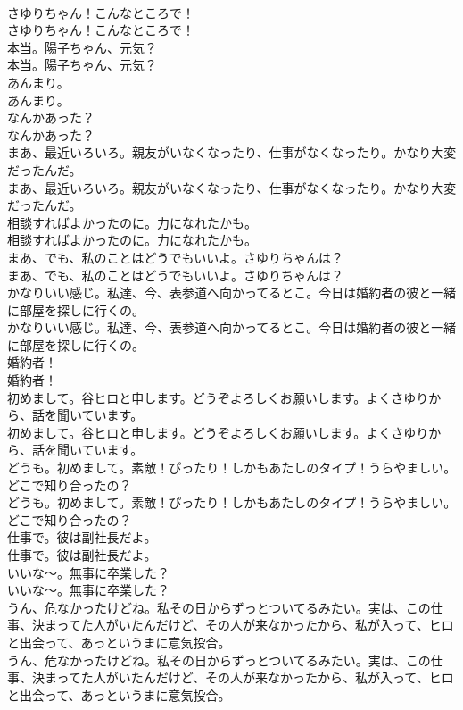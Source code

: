 \documentclass[8pt]{extreport}
\begin{document}
\begin{CJK}{UTF8}{min}
\\	さゆりちゃん！こんなところで！	
\\	さゆりちゃん！こんなところで！ 
\\	本当。陽子ちゃん、元気？	
\\	本当。陽子ちゃん、元気？ 
\\	あんまり。	
\\	あんまり。 
\\	なんかあった？	
\\	なんかあった？ 
\\	まあ、最近いろいろ。親友がいなくなったり、仕事がなくなったり。かなり大変だったんだ。	
\\	まあ、最近いろいろ。親友がいなくなったり、仕事がなくなったり。かなり大変だったんだ。 
\\	相談すればよかったのに。力になれたかも。	
\\	相談すればよかったのに。力になれたかも。 
\\	まあ、でも、私のことはどうでもいいよ。さゆりちゃんは？	
\\	まあ、でも、私のことはどうでもいいよ。さゆりちゃんは？ 
\\	かなりいい感じ。私達、今、表参道へ向かってるとこ。今日は婚約者の彼と一緒に部屋を探しに行くの。	
\\	かなりいい感じ。私達、今、表参道へ向かってるとこ。今日は婚約者の彼と一緒に部屋を探しに行くの。 
\\	婚約者！	
\\	婚約者！ 
\\	初めまして。谷ヒロと申します。どうぞよろしくお願いします。よくさゆりから、話を聞いています。	
\\	初めまして。谷ヒロと申します。どうぞよろしくお願いします。よくさゆりから、話を聞いています。 
\\	どうも。初めまして。素敵！ぴったり！しかもあたしのタイプ！うらやましい。どこで知り合ったの？	
\\	どうも。初めまして。素敵！ぴったり！しかもあたしのタイプ！うらやましい。どこで知り合ったの？ 
\\	仕事で。彼は副社長だよ。	
\\	仕事で。彼は副社長だよ。 
\\	いいな〜。無事に卒業した？	
\\	いいな〜。無事に卒業した？ 
\\	うん、危なかったけどね。私その日からずっとついてるみたい。実は、この仕事、決まってた人がいたんだけど、その人が来なかったから、私が入って、ヒロと出会って、あっというまに意気投合。	
\\	うん、危なかったけどね。私その日からずっとついてるみたい。実は、この仕事、決まってた人がいたんだけど、その人が来なかったから、私が入って、ヒロと出会って、あっというまに意気投合。 

\end{CJK}
\end{document}
